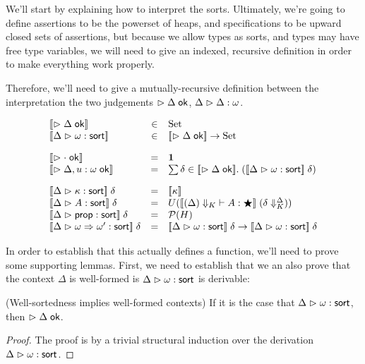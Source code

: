 We'll start by explaining how to interpret the sorts. Ultimately,
we're going to define assertions to be the powerset of heaps, and
specifications to be upward closed sets of assertions, but because we
allow types as sorts, and types may have free type variables, we will
need to give an indexed, recursive definition in order to make
everything work properly.

Therefore, we'll need to give a mutually-recursive definition between
the interpretation the two judgements $\vartriangleright {\Delta} \;\mathsf{ok}$,
${\Delta} \vartriangleright {\Delta} : {\omega}$.

\begin{displaymath}
  \begin{array}{lcl}
    \interp{\judgeACtx{\Delta}} & \in & \mbox{Set} \\
    \interp{\judgeSort{\omega}} & \in & \interp{\judgeACtx{\Delta}} \to \mbox{Set} \\[1em]

    \interp{\judgeACtx{\cdot}} & = & \unittype \\
    \interp{\judgeACtx{\Delta, u:\omega}} & = & \sum \delta \in \interp{\judgeACtx{\Delta}}.\; 
                                                  (\interp{\judgeSort{\omega}}\;\delta) \\[1em]
 
    \interp{\judgeSort{\kappa}}\;\delta & = & \interp{\kappa} \\
    \interp{\judgeSort{A}}\;\delta & = & 
       U(\interp{\judgeWK[\restrictkind{\Delta}]{A}{\bigstar}}\;(\restricttyenv{\Delta}{\delta})) \\
    \interp{\judgeSort{\assert}}\;\delta & = & \powerset{H} \\
    \interp{\judgeSort{\omega \To \omega'}}\;\delta & = &  
       \interp{\judgeSort{\omega}}\;\delta \to \interp{\judgeSort{\omega}}\;\delta \\
  \end{array}
\end{displaymath}

In order to establish that this actually defines a function, we'll
need to prove some supporting lemmas. First, we need to establish that
we an also prove that the context $\Delta$ is well-formed is
${{\Delta}} \vartriangleright {{\omega}} : {\mathsf{sort}}$ is derivable:

\begin{lemma}{(Well-sortedness implies well-formed contexts)}
If it is the case that ${{\Delta}} \vartriangleright {{\omega}} : {\mathsf{sort}}$, then $\vartriangleright {\Delta} \;\mathsf{ok}$.
\end{lemma}
\begin{proof}
The proof is by a trivial structural induction over the derivation ${{\Delta}} \vartriangleright {{\omega}} : {\mathsf{sort}}$. 
\end{proof}


